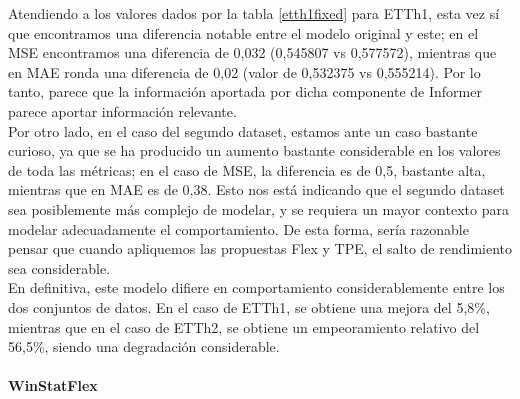   Atendiendo a los valores dados por la tabla \ref{etth1fixed} para ETTh1, esta vez sí que encontramos una diferencia notable entre el modelo original y este; en el MSE encontramos una diferencia de 0,032 (0,545807 vs 0,577572), mientras que en MAE ronda una diferencia de 0,02 (valor de 0,532375 vs 0,555214). Por lo tanto, parece que la información aportada por dicha componente de Informer parece aportar información relevante.\\
  
  Por otro lado, en el caso del segundo dataset, estamos ante un caso bastante curioso, ya que se ha producido un aumento bastante considerable en los valores de toda las métricas; en el caso de MSE, la diferencia es de 0,5, bastante alta, mientras que en MAE es de 0,38. Esto nos está indicando que el segundo dataset sea posiblemente más complejo de modelar, y se requiera un mayor contexto para modelar adecuadamente el comportamiento. De esta forma, sería razonable pensar que cuando apliquemos las propuestas Flex y TPE, el salto de rendimiento sea considerable.\\
  
  En definitiva, este modelo difiere en comportamiento considerablemente entre los dos conjuntos de datos. En el caso de ETTh1, se obtiene una mejora del 5,8\%, mientras que en el caso de ETTh2, se obtiene un empeoramiento relativo del 56,5\%, siendo una degradación considerable.
 
 \paragraph{WinStatFlex}
 

